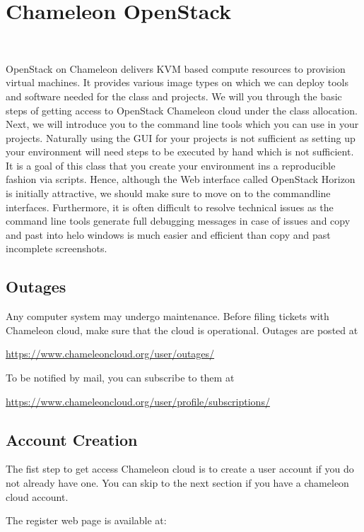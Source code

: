 \section{Chameleon OpenStack}
\label{s:chameleon-openstack}

\FILENAME\

OpenStack on Chameleon delivers KVM based compute resources to
provision virtual machines. It provides various image types on
which we can deploy tools and software needed for the class and
projects. We will you through the basic steps of getting access to
OpenStack Chameleon cloud under the class allocation. Next, we will
introduce you to the command line tools which you can use in your
projects. Naturally using the GUI for your projects is not sufficient
as setting up your environment will need steps to be executed by hand
which is not sufficient. It is a goal of this class that you create
your environment ins a reproducible fashion via scripts.  Hence,
although the Web interface called OpenStack Horizon is initially
attractive, we should make sure to move on to the commandline
interfaces.  Furthermore, it is often difficult to resolve technical
issues as the command line tools generate full debugging messages in
case of issues and copy and past into helo windows is much easier and
efficient than copy and past incomplete screenshots.


\subsection{Outages}

Any computer system may undergo maintenance. Before filing tickets
with Chameleon cloud, make sure that the cloud is operational. Outages
are posted at 

\url{https://www.chameleoncloud.org/user/outages/}

To be notified by mail, you can subscribe to them at 

\url{https://www.chameleoncloud.org/user/profile/subscriptions/}

\subsection{Account Creation}

The fist step to get access Chameleon cloud is to create a user
account if you do not already have one. You can skip to the next
section if you have a chameleon cloud account.

The register web page is available at:

